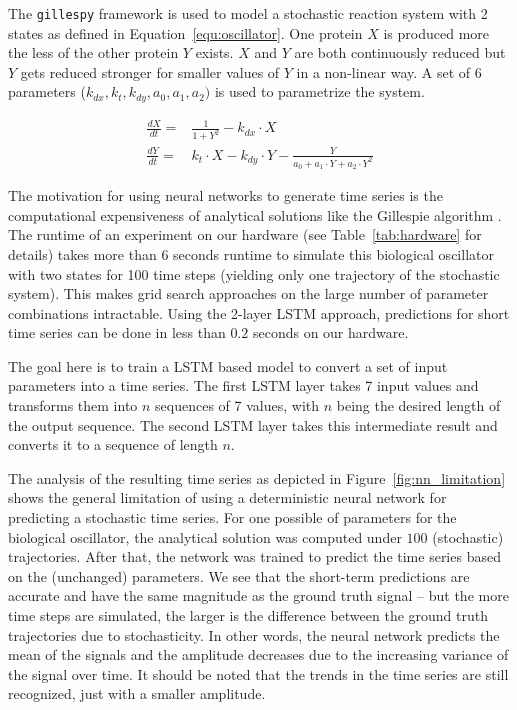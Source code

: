 \documentclass{article}
\begin{document}
The \texttt{gillespy} framework is used to 
model a stochastic reaction system with 2 states as defined 
in Equation~\ref{equ:oscillator}.
One protein $X$ is produced more the less of the other protein $Y$
exists. $X$ and $Y$ are both continuously reduced but $Y$ gets reduced stronger
for smaller values of $Y$ in a non-linear way. A set of 6 parameters
($k_{dx}, k_t, k_{dy}, a_0, a_1, a_2)$
is used to parametrize the system.

\begin{align}
    \frac{dX}{dt} = & \frac{1}{1+Y^2} - k_{dx} \cdot X                                           \\
    \frac{dY}{dt} = & k_t \cdot X - k_{dy} \cdot Y - \frac{Y}{a_0 + a_1 \cdot Y + a_2 \cdot Y^2}
    \label{equ:oscillator}
\end{align}

The motivation for using neural networks to generate time series is the
computational expensiveness of analytical solutions like the Gillespie
algorithm \cite{gillespie1977}. The runtime of an experiment on our hardware
(see Table~\ref{tab:hardware} for details)
takes more than 6 seconds runtime to simulate this biological oscillator with
two states for 100 time steps (yielding only one trajectory of the stochastic
system). This makes grid search approaches on the large number
of parameter
combinations intractable. Using the 2-layer LSTM approach, predictions for
short time series can be done in less than $0.2$ seconds on our hardware.

The goal here is to train a LSTM based
model to convert a set of input parameters into a time series. The first
LSTM layer
takes 7 input values and transforms them into $n$ sequences of 7 values, with
$n$ being the desired length of the output sequence. The second LSTM layer
takes this intermediate result and converts it to a sequence of length $n$.

The analysis of the resulting time series as depicted in
Figure~\ref{fig:nn_limitation} shows the general limitation of using a
deterministic neural network for predicting a stochastic time series. For one
possible of parameters for the biological oscillator, the analytical solution
was computed under $100$ (stochastic) trajectories. After that, the network was
trained to predict the time series based on the (unchanged) parameters. We see
that the short-term predictions are accurate and have the same magnitude as the
ground truth signal -- but the more time steps are simulated, the larger is the
difference between the ground truth trajectories due to stochasticity. In other
words, the neural network predicts the mean of the signals and the amplitude
decreases due to the increasing variance of the signal over time.
It should be noted that the trends in the time series are still
recognized, just with a smaller amplitude.
\end{document}

